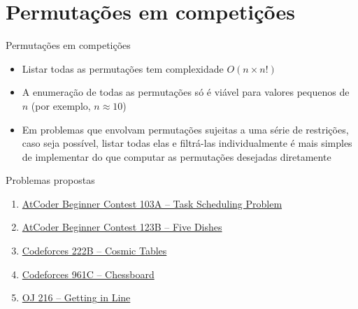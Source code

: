 \section{Permutações em competições}

\begin{frame}[fragile]{Permutações em competições}

    \begin{itemize}
        \item Listar todas as permutações tem complexidade $O(n\times n!)$

        \item A enumeração de todas as permutações só é viável para valores pequenos de $n$ (por exemplo, 
            $n \approx 10$) 

        \item Em problemas que envolvam permutações sujeitas a uma série de restrições, caso seja possível, listar 
            todas elas e filtrá-las individualmente é mais simples de implementar do que computar as permutações 
            desejadas diretamente
    \end{itemize}

\end{frame}

\begin{frame}[fragile]{Problemas propostas}

    \begin{enumerate}
        \item \href{https://atcoder.jp/contests/abc103/tasks/abc103_a}{AtCoder Beginner Contest 103A -- Task Scheduling Problem}

        \item \href{https://atcoder.jp/contests/abc123/tasks/abc123_b}{AtCoder Beginner Contest 123B -- Five Dishes}
        \item \href{https://codeforces.com/problemset/problem/222/B}{Codeforces 222B -- Cosmic Tables}
        \item \href{https://codeforces.com/problemset/problem/961/C}{Codeforces 961C -- Chessboard}

        \item \href{https://onlinejudge.org/index.php?option=com_onlinejudge&Itemid=8&page=show_problem&category=0&problem=152&mosmsg=Submission+received+with+ID+26304411}{OJ 216 -- Getting in Line}
    \end{enumerate}

\end{frame}
